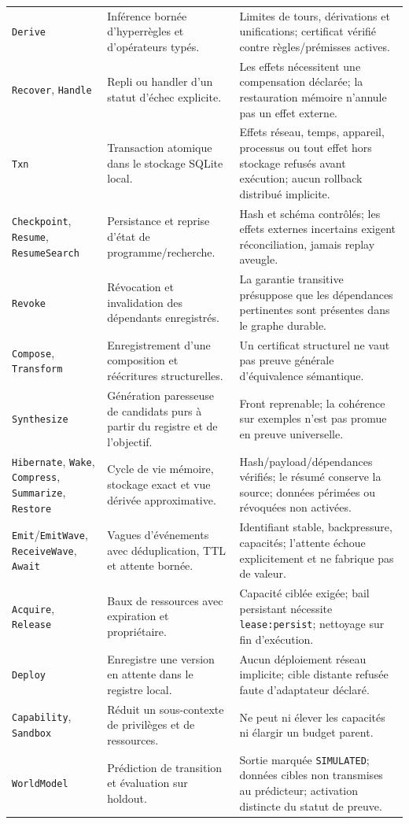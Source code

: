 \documentclass[11pt,a4paper,openany]{book}
\newcommand{\code}[1]{\texttt{#1}}
\theoremstyle{definition}
\theoremstyle{plain}
\theoremstyle{remark}
\begin{document}
\begin{longtable}{p{}p{}p{}}
\code{Derive} & Inférence bornée d'hyperrègles et d'opérateurs typés. & Limites de tours, dérivations et unifications; certificat vérifié contre règles/prémisses actives.\\
\code{Recover}, \code{Handle} & Repli ou handler d'un statut d'échec explicite. & Les effets nécessitent une compensation déclarée; la restauration mémoire n'annule pas un effet externe.\\
\code{Txn} & Transaction atomique dans le stockage SQLite local. & Effets réseau, temps, appareil, processus ou tout effet hors stockage refusés avant exécution; aucun rollback distribué implicite.\\
\code{Checkpoint}, \code{Resume}, \code{ResumeSearch} & Persistance et reprise d'état de programme/recherche. & Hash et schéma contrôlés; les effets externes incertains exigent réconciliation, jamais replay aveugle.\\
\code{Revoke} & Révocation et invalidation des dépendants enregistrés. & La garantie transitive présuppose que les dépendances pertinentes sont présentes dans le graphe durable.\\
\code{Compose}, \code{Transform} & Enregistrement d'une composition et réécritures structurelles. & Un certificat structurel ne vaut pas preuve générale d'équivalence sémantique.\\
\code{Synthesize} & Génération paresseuse de candidats purs à partir du registre et de l'objectif. & Front reprenable; la cohérence sur exemples n'est pas promue en preuve universelle.\\
\code{Hibernate}, \code{Wake}, \code{Compress}, \code{Summarize}, \code{Restore} & Cycle de vie mémoire, stockage exact et vue dérivée approximative. & Hash/payload/dépendances vérifiés; le résumé conserve la source; données périmées ou révoquées non activées.\\
\code{Emit}/\code{EmitWave}, \code{ReceiveWave}, \code{Await} & Vagues d'événements avec déduplication, TTL et attente bornée. & Identifiant stable, backpressure, capacités; l'attente échoue explicitement et ne fabrique pas de valeur.\\
\code{Acquire}, \code{Release} & Baux de ressources avec expiration et propriétaire. & Capacité ciblée exigée; bail persistant nécessite \code{lease:persist}; nettoyage sur fin d'exécution.\\
\code{Deploy} & Enregistre une version en attente dans le registre local. & Aucun déploiement réseau implicite; cible distante refusée faute d'adaptateur déclaré.\\
\code{Capability}, \code{Sandbox} & Réduit un sous-contexte de privilèges et de ressources. & Ne peut ni élever les capacités ni élargir un budget parent.\\
\code{WorldModel} & Prédiction de transition et évaluation sur holdout. & Sortie marquée \code{SIMULATED}; données cibles non transmises au prédicteur; activation distincte du statut de preuve.\\
\bottomrule
\end{longtable}
\normalsize
\end{document}
